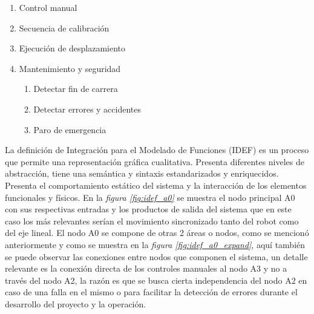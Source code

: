 \begin{enumerate}
\begin{enumerate}[label*=\arabic*.]
        \item Control manual
        \item Secuencia de calibración
        \item Ejecución de desplazamiento
        \item Mantenimiento y seguridad
        \begin{enumerate}[label*=\arabic*.]
            \item Detectar fin de carrera
            \item Detectar errores y accidentes
            \item Paro de emergencia
        \end{enumerate}
     \end{enumerate}
\end{enumerate}
La definición de Integración para el Modelado de Funciones (IDEF) es un proceso que permite una representación gráfica cualitativa. Presenta diferentes niveles de abstracción, tiene una semántica y sintaxis estandarizados y enriquecidos. Presenta el comportamiento estático del sistema y la interacción de los elementos funcionales y físicos. 
En la \textit{figura \ref{fig:idef_a0}} se muestra el nodo principal A0 con sus respectivas entradas y los productos de salida del sistema  que en este caso los más relevantes serían el movimiento sincronizado tanto del robot como del eje lineal. El nodo A0 se compone de otras 2 áreas o nodos, como se mencionó anteriormente y como se muestra en la\textit{ figura \ref{fig:idef_a0_expand}}, aquí también se puede observar las conexiones entre nodos que componen el sistema, un detalle relevante es la conexión directa de los controles manuales al nodo A3 y no a través del nodo A2, la razón es que se busca cierta independencia del nodo A2 en caso de una falla en el mismo o para facilitar la detección de errores durante el desarrollo del proyecto y la operación.

